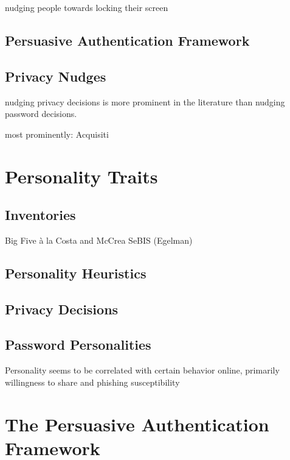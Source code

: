 nudging people towards locking their screen \cite{Bruggen2013ModifiyngUnlockingBehavior}

	\subsection{Persuasive Authentication Framework}
	\subsection{Privacy Nudges}
	nudging privacy decisions is more prominent in the literature than nudging password decisions. 
	
	
	most prominently: Acquisiti \etal \cite{Acquisti2017NudgesPrivacySecurity} \cite{Acquisti2005PrivacyRationality}

\section{Personality Traits}
	\subsection{Inventories}
	Big Five à la Costa and McCrea \cite{Costa1992NEO}
	SeBIS (Egelman)
	\subsection{Personality Heuristics}	
	\subsection{Privacy Decisions}
	\subsection{Password Personalities}
	
	
	Personality seems to be correlated with certain behavior online, primarily willingness to share and phishing susceptibility \cite{Halevi2013PilotStudyPersonality}

\section{The Persuasive Authentication Framework}


